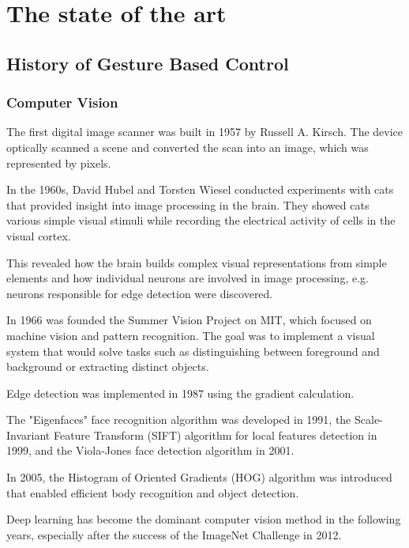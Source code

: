 \chapter{The state of the art}

\section{History of Gesture Based Control}
\subsection{Computer Vision}
The first digital image scanner was built in 1957 by Russell A. Kirsch. The device optically scanned a scene and converted the scan into an image, which was represented by pixels.\par
In the 1960s, David Hubel and Torsten Wiesel conducted experiments with cats that provided insight into image processing in the brain. They showed cats various simple visual stimuli while recording the electrical activity of cells in the visual cortex.\par
This revealed how the brain builds complex visual representations from simple elements and how individual neurons are involved in image processing, e.g. neurons responsible for edge detection were discovered.\par
In 1966 was founded the Summer Vision Project on MIT, which focused on machine vision and pattern recognition. The goal was to implement a visual system that would solve tasks such as distinguishing between foreground and background or extracting distinct objects.\par
Edge detection was implemented in 1987 using the gradient calculation.\par
The "Eigenfaces" face recognition algorithm was developed in 1991, the Scale-Invariant Feature Transform (SIFT) algorithm for local features detection in 1999, and the Viola-Jones face detection algorithm in 2001.\par
In 2005, the Histogram of Oriented Gradients (HOG) algorithm was introduced that enabled efficient body recognition and object detection.\par
Deep learning has become the dominant computer vision method in the following years, especially after the success of the ImageNet Challenge in 2012.\par

